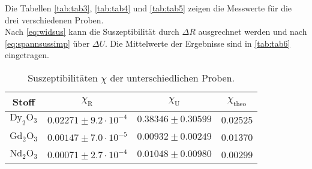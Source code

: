 Die Tabellen \autoref{tab:tab3}, \autoref{tab:tab4} und \autoref{tab:tab5} zeigen die Messwerte für die drei verschiedenen Proben.\\
Nach \eqref{eq:widsus} kann die Suszeptibilität durch $ \Delta R $ ausgrechnet werden und nach \eqref{eq:spannsussimp} über $\Delta U$.
Die Mittelwerte der Ergebnisse sind in \autoref{tab:tab6} eingetragen.


\begin{table}[H]
    \centering
    \caption{Suszeptibilitäten $\chi$ der unterschiedlichen Proben.}
    \label{tab:tab6}
    \begin{tabular}{S S S S}
      \toprule
       {Stoff} & {$\chi_{\text{R}}$} & {$\chi_{\text{U}}$} &{$\chi_{\text{theo}}$}  \\
      \midrule
      {$\text{Dy}_2\text{O}_3$}  &{$0.02271 \pm 9.2 \cdot 10^{-4}$}    &{$ 0.38346 \pm 0.30599$} &{0.02525}         \\
      {$\text{Gd}_2\text{O}_3$}  &{$0.00147 \pm 7.0 \cdot 10^{-5}$}    &{$ 0.00932 \pm 0.00249$} &{0.01370}             \\
      {$\text{Nd}_2 \text{O}_3$} &{$0.00071 \pm 2.7 \cdot 10^{-4}$}    &{$ 0.01048 \pm 0.00980$} &{0.00299}         \\
      \bottomrule
    \end{tabular}
\end{table}
